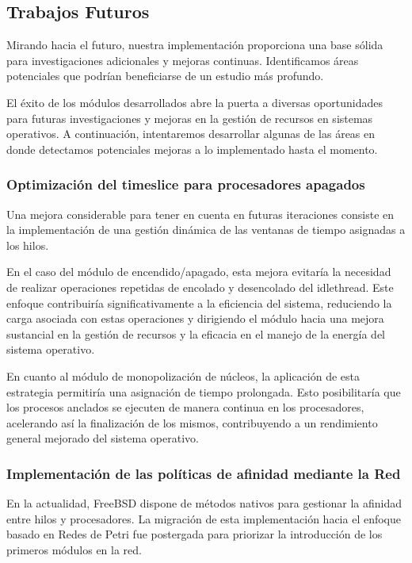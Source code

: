 \subsection{Trabajos Futuros}
Mirando hacia el futuro, nuestra implementación proporciona una base sólida para investigaciones adicionales y mejoras continuas. Identificamos áreas potenciales que podrían beneficiarse de un estudio más profundo.\par

El éxito de los módulos desarrollados abre la puerta a diversas oportunidades para futuras investigaciones y mejoras en la gestión de recursos en sistemas operativos. A continuación, intentaremos desarrollar algunas de las áreas en donde detectamos potenciales mejoras a lo implementado hasta el momento.\par

\subsubsection{Optimización del timeslice para procesadores apagados}
Una mejora considerable para tener en cuenta en futuras iteraciones consiste en la implementación de una gestión dinámica de las ventanas de tiempo asignadas a los hilos.\par

En el caso del módulo de encendido/apagado, esta mejora evitaría la necesidad de realizar operaciones repetidas de encolado y desencolado del idlethread. Este enfoque contribuiría significativamente a la eficiencia del sistema, reduciendo la carga asociada con estas operaciones y dirigiendo el módulo hacia una mejora sustancial en la gestión de recursos y la eficacia en el manejo de la energía del sistema operativo.\par

En cuanto al módulo de monopolización de núcleos, la aplicación de esta estrategia permitiría una asignación de tiempo prolongada. Esto posibilitaría que los procesos anclados se ejecuten de manera continua en los procesadores, acelerando así la finalización de los mismos, contribuyendo a un rendimiento general mejorado del sistema operativo.\par

\subsubsection{Implementación de las políticas de afinidad mediante la Red}
En la actualidad, FreeBSD dispone de métodos nativos para gestionar la afinidad entre hilos y procesadores. La migración de esta implementación hacia el enfoque basado en Redes de Petri fue postergada para priorizar la introducción de los primeros módulos en la red.\par

